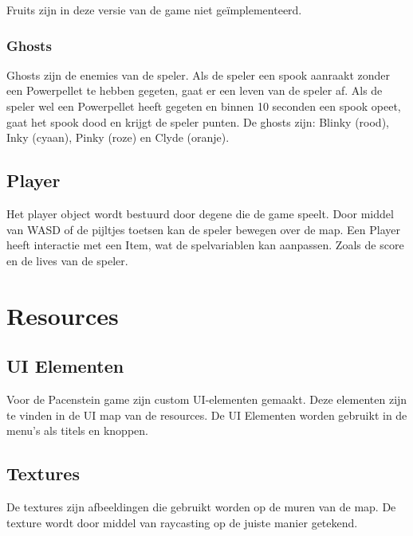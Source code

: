 \documentclass{report}
\begin{document}
    Fruits zijn in deze versie van de game niet geïmplementeerd.

    \subsection{Ghosts} %
    \label{sub:ghosts}
    Ghosts zijn de enemies van de speler. Als de speler een spook aanraakt zonder een Powerpellet te hebben gegeten, gaat er een leven van de speler af. Als de speler wel een Powerpellet heeft gegeten en binnen 10 seconden een spook opeet, gaat het spook dood en krijgt de speler punten. De ghosts zijn: Blinky (rood), Inky (cyaan), Pinky (roze) en Clyde (oranje).

  \section{Player} %
  \label{sec:player}
  Het player object wordt bestuurd door degene die de game speelt. Door middel van WASD of de pijltjes toetsen kan de speler bewegen over de map. Een Player heeft interactie met een Item, wat de spelvariablen kan aanpassen. Zoals de score en de lives van de speler.

\chapter{Resources} %
\label{cha:resources}

  \section{UI Elementen} %
  \label{sec:ui_elementen}
  Voor de Pacenstein game zijn custom UI-elementen gemaakt. Deze elementen zijn te vinden in de UI map van de resources. De UI Elementen worden gebruikt in de menu’s als titels en knoppen.

  \section{Textures} %
  \label{sec:textures}
  De textures zijn afbeeldingen die gebruikt worden op de muren van de map. De texture wordt door middel van raycasting op de juiste manier getekend.
\end{document}
